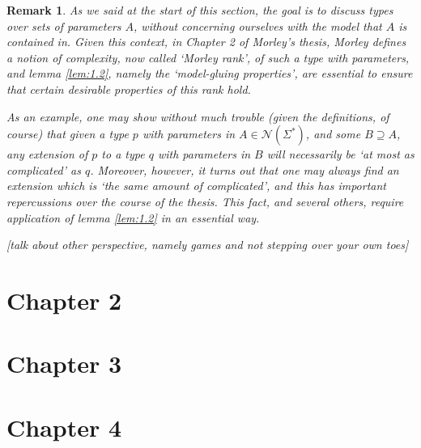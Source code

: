 \documentclass{article}
\newtheorem{remark}[theorem]{Remark}
\theoremstyle{nonumberplain}
\newcommand{\calN}{\mathcal{N}}
\begin{document}
\begin{remark}
As we said at the start of this section, the goal is to discuss types over sets of parameters $A$, without concerning ourselves with the model that $A$ is contained in. Given this context, in Chapter 2 of Morley's thesis, Morley defines a notion of complexity, now called `Morley rank', of such a type with parameters, and lemma \ref{lem:1.2}, namely the `model-gluing properties', are essential to ensure that certain desirable properties of this rank hold.

As an example, one may show without much trouble (given the definitions, of course) that given a type $p$ with parameters in $A \in \calN(\Sigma^*)$, and some $B \supseteq A$, any extension of $p$ to a type $q$ with parameters in $B$ will necessarily be `at most as complicated' as $q$. Moreover, however, it turns out that one may always find an extension which is `the same amount of complicated', and this has important repercussions over the course of the thesis. This fact, and several others, require application of lemma \ref{lem:1.2} in an essential way.

[talk about other perspective, namely games and not stepping over your own toes]
\end{remark}


\section{Chapter 2}\label{sec:ch2}

\section{Chapter 3}\label{sec:ch3}

\section{Chapter 4}\label{sec:ch4}




\end{document}
